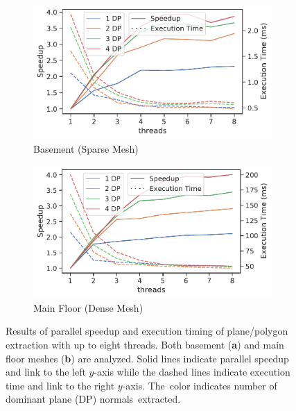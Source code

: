 \begin{figure}[!ht]
  \begin{subfigure}[t]{.49\linewidth}
    \centering\includegraphics[width=.95\linewidth]{chapter_3_polylidar3d/imgs/meshes/basement_speedup.pdf}
    \caption{\label{fig:ch3_mesh_parallel_a}Basement (Sparse Mesh)}
  \end{subfigure}
  \begin{subfigure}[t]{.49\linewidth}
    \centering\includegraphics[width=.95\linewidth]{chapter_3_polylidar3d/imgs/meshes/mainfloor_speedup.pdf}
    \caption{\label{fig:ch3_mesh_parallel_b}Main Floor (Dense Mesh)}
  \end{subfigure}
  \caption[Results of parallel speedup and execution timing of Polylidar3D]{Results of parallel speedup and execution timing of plane/polygon extraction with up to eight threads. Both basement (\textbf{a}) and main floor meshes (\textbf{b}) are analyzed. Solid lines indicate parallel speedup and link to the left $y$-axis while the dashed lines indicate execution time and link to the right $y$-axis. The~color indicates number of dominant plane (DP) normals~extracted.}\label{fig:ch3_mesh_parallel}
\end{figure}
\unskip



